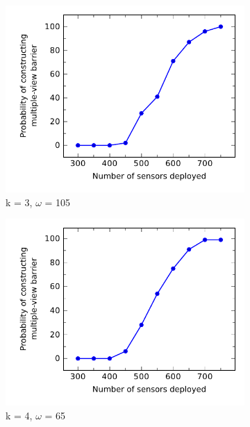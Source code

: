 %
\begin{figure}[h]
	\begin{subfigure}{.5\textwidth}
		\centering
		\includegraphics[scale=.8]{Hinhanh/SensorNumberEffect/probability/k3omega105.pdf}
		\caption{k = 3, $\omega$ = 105}
	\end{subfigure}
	\begin{subfigure}{.5\textwidth}
		\centering
		\includegraphics[scale=.8]{Hinhanh/SensorNumberEffect/probability/k4omega65.pdf}
		\caption{k = 4, $\omega$ = 65}
	\end{subfigure}
\caption{}
\label{fig:}
\end{figure}

